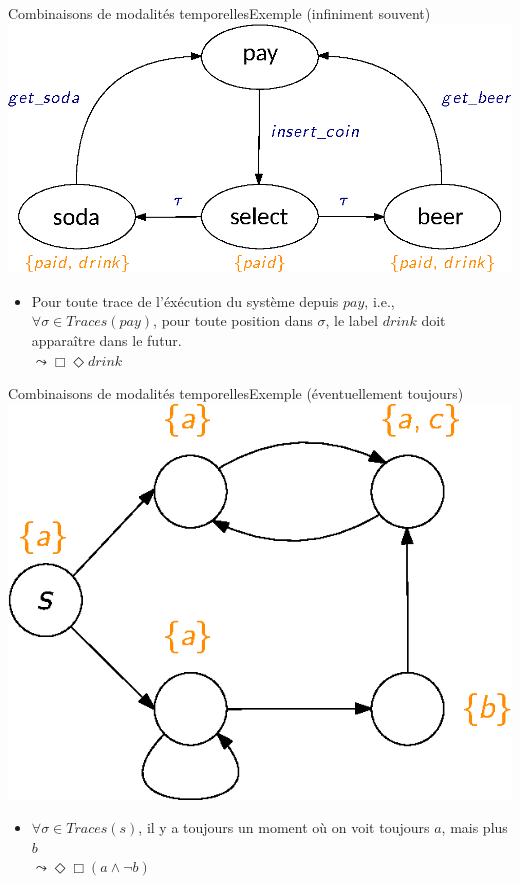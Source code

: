 \documentclass[compress]{beamer}
\begin{document}
\begin{frame}{Combinaisons de modalités temporelles}{Exemple (infiniment souvent)}
    \centering
    \includegraphics[width=0.7\linewidth]{resources/TS.eps}
    \begin{itemize}
      \item Pour toute trace de l'éxécution du système depuis $pay$, i.e., $\forall \sigma \in
        Traces(pay)$, pour toute position dans $\sigma$, le label $drink$ doit apparaître dans le futur. \\
      $\leadsto \Box\Diamond drink$
    \end{itemize}
\end{frame}

\begin{frame}{Combinaisons de modalités temporelles}{Exemple (éventuellement toujours)}
  \centering
  \includegraphics[width=0.45\linewidth]{resources/LTL_example2}
  \begin{itemize}
    \item $\forall \sigma \in Traces(s)$, il y a toujours un moment où on voit toujours $a$, mais plus $b$ \\
    $\leadsto \Diamond\Box(a \wedge \neg b)$
  \end{itemize}
\end{frame}
\end{document}
